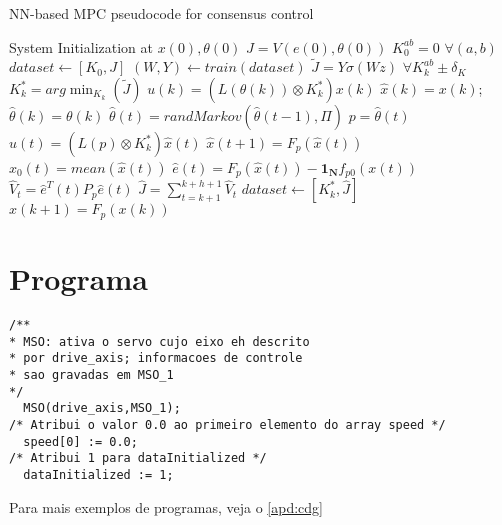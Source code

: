 \begin{algorithm} [ht]
\caption{NN-based MPC pseudocode for consensus control}
\label{alg:NNMPC}
\begin{algorithmic}[1]

    \State System Initialization at $x(0), \theta(0)$
    \State $J = V(e(0),\theta(0))$
    \State $K^{ab}_0 = 0$ $\forall (a,b)$
    \State $dataset \gets [K_0,J]$
     
        \State $(W,Y) \gets train(dataset)$
        \State $\tilde{J} = Y\sigma(Wz)$ $\forall K^{ab}_k\pm \delta_K
        $
        \State $K_k^{\ast} = arg \min_{K_k}(\tilde{J})$
        \State $u(k) =  \left( L(\theta(k)) \otimes K_k^{\ast} \right) x(k)$
        \State $\hat{x}(k) = x(k)$; $\hat{\theta}(k) = \theta(k)$
         
                \State $\hat{\theta}(t) = randMarkov(\hat{\theta}(t-1),\Pi)$
                \State $p = \hat{\theta}(t)$
                \State $\hat{u}(t) = \left( L(p) \otimes K_k^{\ast} \right) \hat{x}(t)$
                \State $\hat{x}(t+1) = F_p(\hat{x}(t))$
                \State $x_0(t) = mean(\hat{x}(t))$
                \State $\hat{e}(t) = F_p(\hat{x}(t)) - \boldsymbol{1_N} f_{p0}(x(t)) $
                \State $\hat{V}_t = \hat{e}^T(t)P_{p}\hat{e}(t)$
                \EndFor
        \State $\hat{J} = \sum_{t = k+1}^{k+h+1} \hat{V}_t$
        \State $dataset \gets [K^{\ast}_k,\hat{J}]$
        \State $x(k+1) = F_p(x(k))$
    \EndFor
    

\end{algorithmic}
\end{algorithm}

\section{Programa}

\begin{lstlisting}
/**
* MSO: ativa o servo cujo eixo eh descrito
* por drive_axis; informacoes de controle
* sao gravadas em MSO_1
*/
  MSO(drive_axis,MSO_1);
/* Atribui o valor 0.0 ao primeiro elemento do array speed */
  speed[0] := 0.0; 
/* Atribui 1 para dataInitialized */
  dataInitialized := 1;
\end{lstlisting}

Para mais exemplos de programas, veja o \cref{apd:cdg}